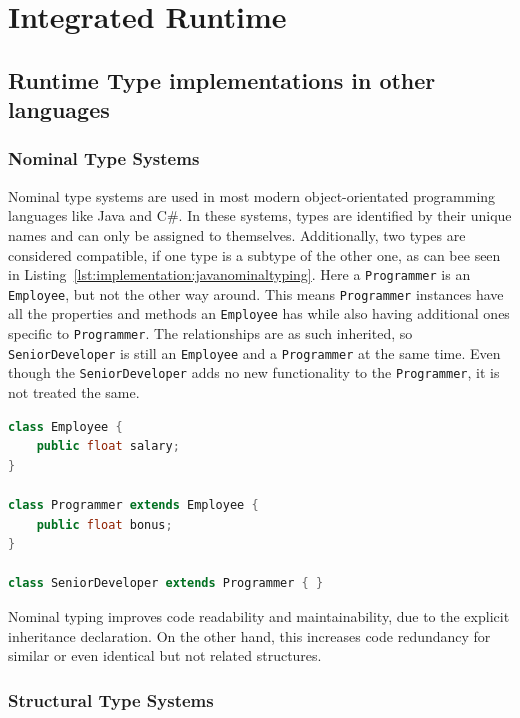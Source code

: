 \section{Integrated Runtime}
\label{sec:integrated-runtime}

\subsection{Runtime Type implementations in other languages}
\label{chap:runtime-other-languages}

\subsubsection{Nominal Type Systems}

Nominal type systems are used in most modern object-orientated programming languages like Java and C\#. In these systems, types are identified by their unique names and can only be assigned to themselves. Additionally, two types are considered compatible, if one type is a subtype of the other one, as can bee seen in Listing~\ref{lst:implementation:javanominaltyping}. Here a  \lstinline|Programmer| is an \lstinline|Employee|, but not the other way around. This means \lstinline|Programmer| instances have all the properties and methods an \lstinline|Employee| has while also having additional ones specific to \lstinline|Programmer|. The relationships are as such inherited, so \lstinline|SeniorDeveloper| is still an \lstinline|Employee| and a \lstinline|Programmer| at the same time. Even though the \lstinline|SeniorDeveloper| adds no new functionality to the \lstinline|Programmer|, it is not treated the same.

\begin{lstlisting}[language=Java,caption=Example of nominal typing in Java,label=lst:implementation:javanominaltyping]
class Employee {
	public float salary;
}

class Programmer extends Employee {
	public float bonus;
}

class SeniorDeveloper extends Programmer { }
\end{lstlisting}

Nominal typing improves code readability and maintainability, due to the explicit inheritance declaration. On the other hand, this increases code redundancy for similar or even identical but not related structures.

\subsubsection{Structural Type Systems}

